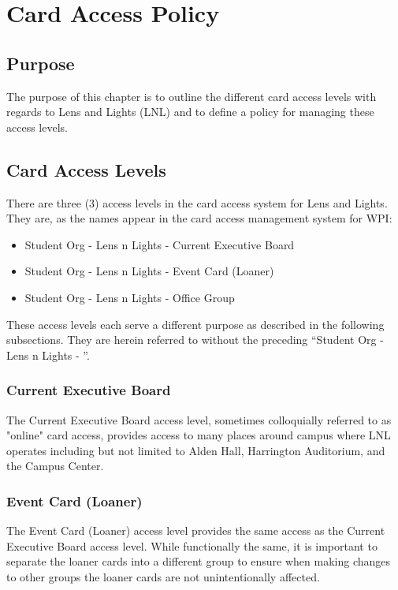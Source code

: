 \documentclass[12pt,letterpaper]{book}
\begin{document}
\chapter{Card Access Policy}

\section{Purpose}
The purpose of this chapter is to outline the different card access levels with regards to Lens and Lights (LNL) and to define a policy for managing these access levels.

\section{Card Access Levels}
There are three (3) access levels in the card access system for Lens and Lights. They are, as the names appear in the card access management system for WPI:

\begin{itemize}
    \item Student Org - Lens n Lights - Current Executive Board
    \item Student Org - Lens n Lights - Event Card (Loaner)
    \item Student Org - Lens n Lights - Office Group
\end{itemize}

These access levels each serve a different purpose as described in the following subsections. They are herein referred to without the preceding ``Student Org - Lens n Lights - ''.

\subsection{Current Executive Board}
The Current Executive Board access level, sometimes colloquially referred to as "online" card access, provides access to many places around campus where LNL operates including but not limited to Alden Hall, Harrington Auditorium, and the Campus Center.

\subsection{Event Card (Loaner)}
The Event Card (Loaner) access level provides the same access as the Current Executive Board access level. While functionally the same, it is important to separate the loaner cards into a different group to ensure when making changes to other groups the loaner cards are not unintentionally affected.
\end{document}
